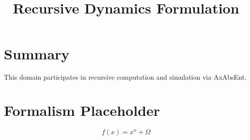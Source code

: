\documentclass[12pt]{article}
\title{\textbf{Recursive Dynamics Formulation}}
\begin{document}
\maketitle

\section*{Summary}
This domain participates in recursive computation and simulation via AxAbsEnt.

\section*{Formalism Placeholder}
\[
f(x) = x^n + \Omega
\]
\end{document}
